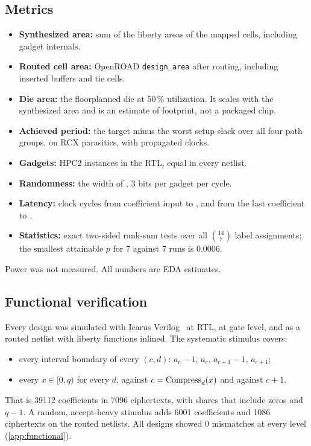 \subsection{Metrics}
\begin{itemize}
  \item \textbf{Synthesized area:} sum of the liberty areas of the mapped cells, including gadget internals.
  \item \textbf{Routed cell area:} OpenROAD \texttt{design\_area} after routing, including inserted buffers and tie cells.
  \item \textbf{Die area:} the floorplanned die at 50\,\% utilization. It scales with the synthesized area and is an estimate of footprint, not a packaged chip.
  \item \textbf{Achieved period:} the target minus the worst setup slack over all four path groups, on RCX parasitics, with propagated clocks.
  \item \textbf{Gadgets:} HPC2 instances in the RTL, equal in every netlist.
  \item \textbf{Randomness:} the width of , 3 bits per gadget per cycle.
  \item \textbf{Latency:} clock cycles from coefficient input to , and from the last coefficient to .
  \item \textbf{Statistics:} exact two-sided rank-sum tests over all $\binom{14}{7}$ label assignments; the smallest attainable $p$ for 7 against 7 runs is $0.0006$.
\end{itemize}
Power was not measured. All numbers are EDA estimates.

\subsection{Functional verification}
Every design was simulated with Icarus Verilog~\cite{icarus} at RTL, at gate level, and as a routed netlist with liberty functions inlined. The systematic stimulus covers:
\begin{itemize}
  \item every interval boundary of every $(c, d)$: $a_c - 1$, $a_c$, $a_{c+1} - 1$, $a_{c+1}$;
  \item every $x \in [0, q)$ for every $d$, against $c = \operatorname{Compress}_d(x)$ and against $c + 1$.
\end{itemize}
That is \num{39112} coefficients in \num{7096} ciphertexts, with shares that include zeros and $q - 1$. A random, accept-heavy stimulus adds \num{6001} coefficients and \num{1086} ciphertexts on the routed netlists. All designs showed 0 mismatches at every level (\cref{app:functional}).
